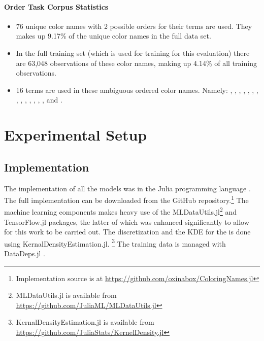 \paragraph{Order Task Corpus Statistics}
\begin{itemize}
	\item 76 unique color names with 2 possible orders for their terms are used. They makes up 9.17\% of the unique color names in the full data set.
	\item In the full training set (which is used for training for this evaluation) there are 63,048 observations of these color names, making up 4.14\% of all training observations.
	\item 16 terms are used in these ambiguous ordered color names. Namely:
	, , , , , , , , , , , , , ,  and \natlang{-}.
\end{itemize}



\section{Experimental Setup}

\subsection{Implementation}
The implementation of all the models was in the Julia programming language \parencite{Julia}.
The full implementation can be downloaded from the GitHub repository.\footnote{Implementation source is at \url{https://github.com/oxinabox/ColoringNames.jl}}
The machine learning components makes heavy use of the MLDataUtils.jl\footnote{MLDataUtils.jl is available from \url{https://github.com/JuliaML/MLDataUtils.jl}} and TensorFlow.jl \parencite{TensorFlowJulia}
 packages,
the latter of which was enhanced significantly to allow for this work to be carried out.
The discretization and the KDE for the \empmodel{} is done using KernalDensityEstimation.jl.%
\footnote{KernalDensityEstimation.jl  is available from \url{https://github.com/JuliaStats/KernelDensity.jl}}
The training data is managed with DataDeps.jl \parencite{2018arXiv180801091W}.

